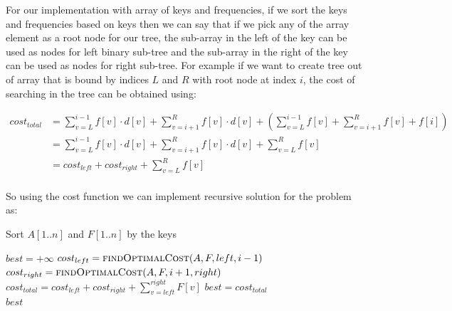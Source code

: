\documentclass[11pt]{article}
\theoremstyle{definition}
\begin{document}
    For our implementation with array of keys and frequencies, if we sort the keys and frequencies based on keys then we can say that if we pick any of the array element as a root node for our tree, the sub-array in the left of the key can be used as nodes for left binary sub-tree and the sub-array in the right of the key can be used as nodes for right sub-tree. For example if we want to create tree out of array that is bound by indices $L$ and $R$ with root node at index $i$, the cost of searching in the tree can be obtained using: 
     \begin{center}
        \begin{align*}
            cost_{total} &= \sum_{v=L}^{i-1} f[v]\cdot d[v] + \sum_{v = i + 1}^{R} f[v]\cdot d[v] + \left(\sum_{v=L}^{i-1} f[v] + \sum_{v = i + 1}^{R} f[v] + f[i]\right)\\
            &= \sum_{v=L}^{i-1} f[v]\cdot d[v] + \sum_{v = i + 1}^{R} f[v]\cdot d[v] + \sum_{v=L}^{R} f[v]\\
            &= cost_{left} + cost_{right} + \sum_{v=L}^{R} f[v]\\
        \end{align*}
    \end{center}
So using the cost function we can implement recursive solution for the problem as:

\begin{algorithm}[H]
\caption{}\label{Main}
\begin{algorithmic}[1]
\State Sort $A[1..n]$ and $F[1..n]$ by the keys
\State \Return {}
\end{algorithmic}
\end{algorithm}

\begin{algorithm}[H]
\caption{}\label{findOptimalCost}
\begin{algorithmic}[1]
\State $best = +\infty$
 
    \State $cost_{left} = \Call{findOptimalCost}{A, F, left, i-1}$
    \State $cost_{right} = \Call{findOptimalCost}{A, F, i+1, right}$
    \State $cost_{total} = cost_{left} + cost_{right} + \sum_{v=left}^{right} F[v]$
      \State $best = cost_{total}$
    \EndIf
\EndFor\\
\Return $best$
\end{algorithmic}
\end{algorithm}
\end{document}
